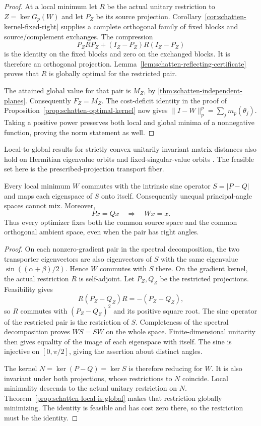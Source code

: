 \begin{proof}
At a local minimum let $R$ be the actual unitary restriction to
$Z=\ker G_p(W)$ and let $P_Z$ be its source projection.
Corollary~\ref{cor:schatten-kernel-fixed-right} supplies a complete
orthogonal family of fixed blocks and source/complement exchanges.
The compression
\[
 P_ZRP_Z+(I_Z-P_Z)R(I_Z-P_Z)
\]
is the identity on the fixed blocks and zero on the exchanged blocks.
It is therefore an orthogonal projection. Lemma~\ref{lem:schatten-reflecting-certificate}
proves that $R$ is globally optimal for the restricted pair.

The attained global value for that pair is $M_Z$, by
\cref{thm:schatten-independent-planes}. Consequently $F_Z=M_Z$.
The cost-deficit identity in the proof of
Proposition~\ref{prop:schatten-optimal-kernel} now gives
$\|I-W\|_p^p=\sum_jm_p(\theta_j)$. Taking a positive power preserves
both local and global minima of a nonnegative function, proving the
norm statement as well.
\end{proof}

Local-to-global results for strictly convex unitarily invariant
matrix distances also hold on Hermitian eigenvalue orbits and
fixed-singular-value orbits \citep[Theorems~3.5 and~3.12]{massey2018local}.
The feasible set here is the prescribed-projection transport fiber.

\begin{proposition}
\label{prop:schatten-angle-preservation}
Every local minimum $W$ commutes with the intrinsic sine operator
$S=|P-Q|$ and maps each eigenspace of $S$ onto itself. Consequently
unequal principal-angle spaces cannot mix. Moreover,
\[
 Px=Qx\quad\Longrightarrow\quad Wx=x.
\]
Thus every optimizer fixes both the common source space and the common
orthogonal ambient space, even when the pair has right angles.
\end{proposition}

\begin{proof}
On each nonzero-gradient pair in the spectral decomposition, the two
transporter eigenvectors are also eigenvectors of $S$ with the same
eigenvalue $\sin((\alpha+\beta)/2)$. Hence $W$ commutes with $S$ there.
On the gradient kernel, the actual restriction $R$ is self-adjoint.
Let $P_Z,Q_Z$ be the restricted projections. Feasibility gives
\[
 R(P_Z-Q_Z)R=-(P_Z-Q_Z),
\]
so $R$ commutes with $(P_Z-Q_Z)^2$ and its positive square root.
The sine operator of the restricted pair is the restriction of $S$.
Completeness of the spectral decomposition proves $WS=SW$ on the
whole space. Finite-dimensional unitarity then gives equality of the
image of each eigenspace with itself. The sine is injective on
$[0,\pi/2]$, giving the assertion about distinct angles.

The kernel $N=\ker(P-Q)=\ker S$ is therefore reducing for $W$.
It is also invariant under both projections, whose restrictions to
$N$ coincide. Local minimality descends to the actual unitary
restriction on $N$. Theorem~\ref{prop:schatten-local-is-global}
makes that restriction globally minimizing. The identity is feasible
and has cost zero there, so the restriction must be the identity.
\end{proof}

